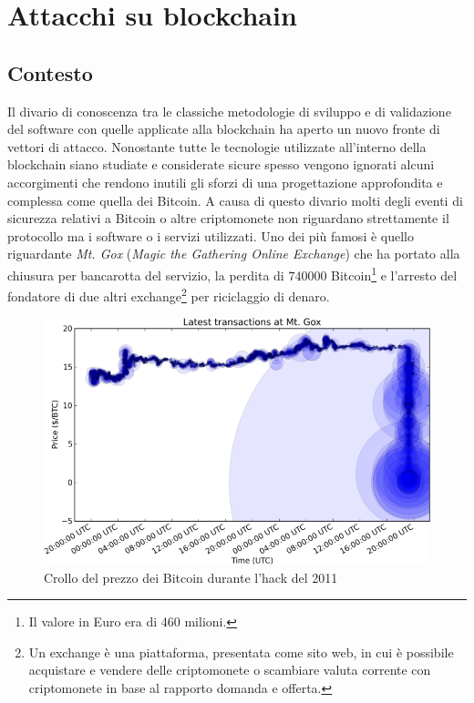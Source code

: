 \chapter{Attacchi su blockchain}

\section{Contesto}
Il divario di conoscenza tra le classiche metodologie di sviluppo e di validazione del software con quelle applicate alla blockchain ha aperto un nuovo fronte di vettori di attacco. Nonostante tutte le tecnologie utilizzate all'interno della blockchain siano studiate e considerate sicure spesso vengono ignorati alcuni accorgimenti che rendono inutili gli sforzi di una progettazione approfondita e complessa come quella dei Bitcoin.\newline
A causa di questo divario molti degli eventi di sicurezza relativi a Bitcoin o altre criptomonete non riguardano strettamente il protocollo ma i software o i servizi utilizzati. Uno dei più famosi è quello riguardante \textit{Mt. Gox} (\textit{Magic the Gathering Online Exchange}) che ha portato alla chiusura per bancarotta del servizio, la perdita di $740000$ Bitcoin\footnote{Il valore in Euro era di 460 milioni.} e l'arresto del fondatore di due altri exchange\footnote{Un exchange è una piattaforma, presentata come sito web, in cui è possibile acquistare e vendere delle criptomonete o scambiare valuta corrente con criptomonete in base al rapporto domanda e offerta.} per riciclaggio di denaro.\newline
\begin{figure}
    \centering
    \includegraphics[width=\textwidth]{images/mtgox_cent.png}
    \caption{Crollo del prezzo dei Bitcoin durante l'hack del 2011}
\end{figure}
